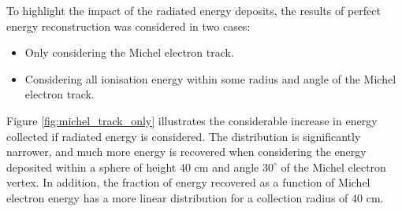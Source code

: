 \noindent
To highlight the impact of the radiated energy deposits, the results of perfect
energy reconstruction was considered in two cases:
\begin{itemize}
	\item Only considering the Michel electron track.
	\item Considering all ionisation energy within some radius and angle of the
		Michel electron track.
\end{itemize}
Figure \ref{fig:michel_track_only} illustrates the considerable increase in
energy collected if radiated energy is considered. The distribution is
significantly narrower, and much more energy is recovered when considering the
energy deposited within a sphere of height $40\mbox{ cm}$ and angle
$30^\circ$ of the Michel electron vertex. In addition, the fraction of energy
recovered as a function of Michel electron energy has a more linear
distribution for a collection radius of 40 cm.
